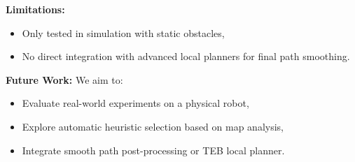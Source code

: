 \documentclass[letterpaper, 10 pt, conference]{ieeeconf}
\begin{document}
\textbf{Limitations:} 
\begin{itemize}
    \item Only tested in simulation with static obstacles,
    \item No direct integration with advanced local planners for final path smoothing.
\end{itemize}

\textbf{Future Work:} 
We aim to:
\begin{itemize}
    \item Evaluate real-world experiments on a physical robot,
    \item Explore automatic heuristic selection based on map analysis,
    \item Integrate smooth path post-processing or TEB local planner.
\end{itemize}





\end{document}
